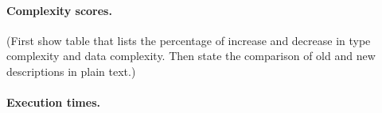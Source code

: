 \paragraph*{Complexity scores.}

(First show table that lists the percentage of increase and decrease in type
complexity and data complexity. Then state the comparison of old and
new descriptions in plain text.)

\paragraph*{Execution times.}

